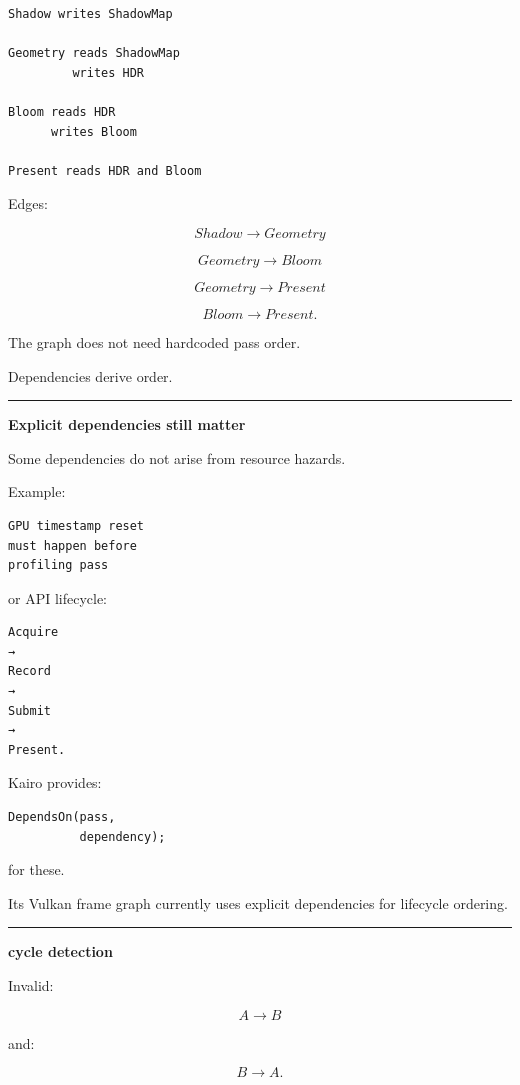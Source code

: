 \begin{verbatim}
Shadow writes ShadowMap

Geometry reads ShadowMap
         writes HDR

Bloom reads HDR
      writes Bloom

Present reads HDR and Bloom
\end{verbatim}

Edges:

\[
Shadow\rightarrow Geometry
\]

\[
Geometry\rightarrow Bloom
\]

\[
Geometry\rightarrow Present
\]

\[
Bloom\rightarrow Present.
\]

The graph does not need hardcoded pass order.

Dependencies derive order.

\begin{center}\rule{0.5\linewidth}{0.5pt}\end{center}

\textbf{Explicit dependencies still matter}

Some dependencies do not arise from resource hazards.

Example:

\begin{verbatim}
GPU timestamp reset
must happen before
profiling pass
\end{verbatim}

or API lifecycle:

\begin{verbatim}
Acquire
→
Record
→
Submit
→
Present.
\end{verbatim}

Kairo provides:

\begin{verbatim}
DependsOn(pass,
          dependency);
\end{verbatim}

for these.

Its Vulkan frame graph currently uses explicit dependencies for lifecycle ordering.

\begin{center}\rule{0.5\linewidth}{0.5pt}\end{center}

\textbf{cycle detection}

Invalid:

\[
A\rightarrow B
\]

and:

\[
B\rightarrow A.
\]

